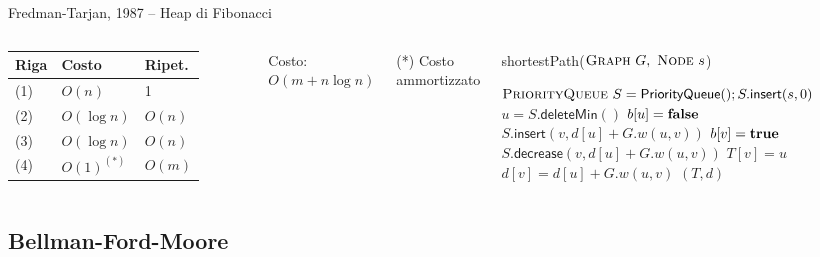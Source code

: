 \vspace{-9pt}
\begin{frame}{Fredman-Tarjan, 1987 -- Heap di Fibonacci}



\begin{columns}

\begingroup
\renewcommand*{\arraystretch}{1.2}
\begin{tabular}{|l|l|l|}
\hline
Riga & Costo & Ripet. \\\hline
(1) & $O(n)$ & 1 \\\hline
(2) & $O(\log n)$ & $O(n)$ \\\hline
(3) & $O(\log n)$ & $O(n)$ \\\hline
(4) & $O(1)^{(*)}$ & $O(m)$ \\\hline
\end{tabular}
\endgroup

\medskip
Costo: \alert{$O(m + n \log n)$}

\medskip
(*) Costo ammortizzato

\vspace{-12pt}
\tiny
\begin{Procedure}
\caption[A]{\textsf{shortestPath}($\textsc{Graph}\ G,\ \textsc{Node}\ s$)}
\alert{$\textsc{PriorityQueue}\ S = \textsf{PriorityQueue}(); S.\textsf{insert}(s, 0)$}\;
{
  \alert{$u = S.\textsf{deleteMin}()$}\;
  $b[u] = \FALSE$\;
  {
    {
      {
        \alert{$S.\textsf{insert}(v, d[u]+G.w(u,v))$}\;
        $b[v] = \TRUE$\;
      }
      {
        \alert{$S.\textsf{decrease}(v, d[u]+G.w(u,v))$}
      }
      $T[v] = u$\;
      $d[v] = d[u] + G.w(u,v)$\;
    }
  }
}
\Return $(T,d)$
\end{Procedure}
\end{columns}

\end{frame}

\subsection{Bellman-Ford-Moore}

